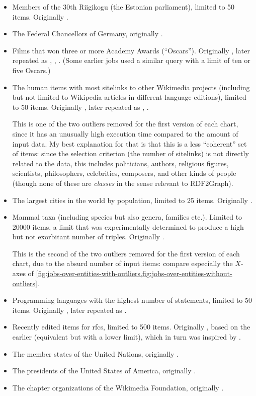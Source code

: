 \begin{itemize}
\item Members of the 30th Riigikogu (the Estonian parliament),
  limited to 50 \glspl{item}.
  Originally .
\item The Federal Chancellors of Germany,
  originally .
\item Films that won three or more Academy Awards (“Oscars”).
  Originally , later repeated as , , .
  (Some earlier jobs used a similar query with a limit of ten or five Oscars.)
\item The human \glspl{item} with most \glspl{sitelink} to other \gls{Wikimedia} projects
  (including but not limited to \gls{Wikipedia} articles in different language editions),
  limited to 50 \glspl{item}.
  Originally , later repeated as , .

  This is one of the two outliers removed for the first version of each chart,
  since it has an unusually high execution time compared to the amount of input data.
  My best explanation for that is that this is a less “coherent” set of \glspl{item}:
  since the selection criterion (the number of sitelinks) is not directly related to the data,
  this includes politicians, authors, religious figures, scientists, philosophers, celebrities, composers, and other kinds of people
  (though none of these are \emph{classes} in the sense relevant to \gls{RDF2Graph}).
\item The largest cities in the world by population,
  limited to 25 \glspl{item}.
  Originally .
\item Mammal taxa (including species but also genera, families etc.).
  Limited to \num{20000} \glspl{item},
  a limit that was experimentally determined to produce a high but not exorbitant number of triples.
  Originally .

  This is the second of the two outliers removed for the first version of each chart,
  due to the absurd number of input \glspl{item}:
  compare especially the $X$-axes of
  \cref{fig:jobs-over-entities-with-outliers,fig:jobs-over-entities-without-outliers}.
\item Programming languages with the highest number of \glspl{statement},
  limited to 50 \glspl{item}.
  Originally , later repeated as .
\item Recently edited \glspl{item} for \glspl{rfc},
  limited to 500 \glspl{item}.
  Originally , based on the earlier  (equivalent but with a lower limit),
  which in turn was inspired by .
\item The member states of the United Nations,
  originally .
\item The presidents of the United States of America,
  originally .
\item The chapter organizations of the \gls{Wikimedia Foundation},
  originally .
\end{itemize}

